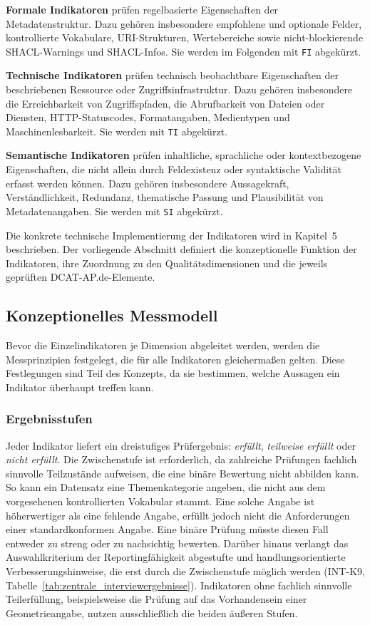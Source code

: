 \textbf{Formale Indikatoren} prüfen regelbasierte Eigenschaften der Metadatenstruktur. Dazu gehören insbesondere empfohlene und optionale Felder, kontrollierte Vokabulare, URI-Strukturen, Wertebereiche sowie nicht-blockierende SHACL-Warnings und SHACL-Infos. Sie werden im Folgenden mit \texttt{FI} abgekürzt.

\textbf{Technische Indikatoren} prüfen technisch beobachtbare Eigenschaften der beschriebenen Ressource oder Zugriffsinfrastruktur. Dazu gehören insbesondere die Erreichbarkeit von Zugriffspfaden, die Abrufbarkeit von Dateien oder Diensten, HTTP-Statuscodes, Formatangaben, Medientypen und Maschinenlesbarkeit. Sie werden mit \texttt{TI} abgekürzt.

\textbf{Semantische Indikatoren} prüfen inhaltliche, sprachliche oder kontextbezogene Eigenschaften, die nicht allein durch Feldexistenz oder syntaktische Validität erfasst werden können. Dazu gehören insbesondere Aussagekraft, Verständlichkeit, Redundanz, thematische Passung und Plausibilität von Metadatenangaben. Sie werden mit \texttt{SI} abgekürzt.

Die konkrete technische Implementierung der Indikatoren wird in Kapitel~5 beschrieben. Der vorliegende Abschnitt definiert die konzeptionelle Funktion der Indikatoren, ihre Zuordnung zu den Qualitätsdimensionen und die jeweils geprüften DCAT-AP.de-Elemente.

\subsection{Konzeptionelles Messmodell}
\label{sec:messmodell}

Bevor die Einzelindikatoren je Dimension abgeleitet werden, werden die Messprinzipien festgelegt, die für alle Indikatoren gleichermaßen gelten. Diese Festlegungen sind Teil des Konzepts, da sie bestimmen, welche Aussagen ein Indikator überhaupt treffen kann.

\subsubsection{Ergebnisstufen}

Jeder Indikator liefert ein dreistufiges Prüfergebnis: \textit{erfüllt}, \textit{teilweise erfüllt} oder \textit{nicht erfüllt}. Die Zwischenstufe ist erforderlich, da zahlreiche Prüfungen fachlich sinnvolle Teilzustände aufweisen, die eine binäre Bewertung nicht abbilden kann. So kann ein Datensatz eine Themenkategorie angeben, die nicht aus dem vorgesehenen kontrollierten Vokabular stammt. Eine solche Angabe ist höherwertiger als eine fehlende Angabe, erfüllt jedoch nicht die Anforderungen einer standardkonformen Angabe. Eine binäre Prüfung müsste diesen Fall entweder zu streng oder zu nachsichtig bewerten. Darüber hinaus verlangt das Auswahlkriterium der Reportingfähigkeit abgestufte und handlungsorientierte Verbesserungshinweise, die erst durch die Zwischenstufe möglich werden (INT-K9, Tabelle~\ref{tab:zentrale_interviewergebnisse}). Indikatoren ohne fachlich sinnvolle Teilerfüllung, beispielsweise die Prüfung auf das Vorhandensein einer Geometrieangabe, nutzen ausschließlich die beiden äußeren Stufen.

